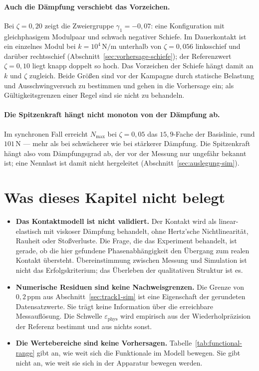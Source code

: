 \documentclass[12pt,a4paper]{report}
\begin{document}
\paragraph{Auch die Dämpfung verschiebt das Vorzeichen.} Bei
$\zeta = 0{,}20$ zeigt die Zweiergruppe $\gamma_1 = -0{,}07$: eine
Konfiguration mit gleichphasigem Modulpaar und schwach negativer
Schiefe. Im Dauerkontakt ist ein einzelnes Modul bei
$k = 10^{4}\,\mathrm{N/m}$ unterhalb von $\zeta = 0{,}056$ linksschief und
darüber rechtsschief (Abschnitt~\ref{sec:vorhersage-schiefe}); der
Referenzwert $\zeta = 0{,}10$ liegt knapp doppelt so hoch. Das
Vorzeichen der Schiefe hängt damit an $k$ und $\zeta$ zugleich. Beide
Größen sind vor der Kampagne durch statische Belastung und
Ausschwingversuch zu bestimmen und gehen in die Vorhersage ein; als
Gültigkeitsgrenzen einer Regel sind sie nicht zu behandeln.

\paragraph{Die Spitzenkraft hängt nicht monoton von der Dämpfung ab.}
Im synchronen Fall erreicht $N_{\max}$ bei $\zeta = 0{,}05$ das
$15{,}9$-Fache der Basislinie, rund $101\,\mathrm{N}$ --- mehr als bei
schwächerer wie bei stärkerer Dämpfung. Die Spitzenkraft hängt also
vom Dämpfungsgrad ab, der vor der Messung nur ungefähr bekannt ist; eine
Nennlast ist damit nicht hergeleitet
(Abschnitt~\ref{sec:auslegung-sim}).

\section{Was dieses Kapitel nicht belegt}

\begin{itemize}
  \item \textbf{Das Kontaktmodell ist nicht validiert.} Der Kontakt wird
        als linear-elastisch mit viskoser Dämpfung behandelt, ohne
        Hertz'sche Nichtlinearität, Rauheit oder Stoßverluste. Die Frage,
        die das Experiment behandelt, ist gerade, ob die hier gefundene
        Phasenabhängigkeit den Übergang zum realen Kontakt übersteht.
        Übereinstimmung zwischen Messung und Simulation ist nicht das
        Erfolgskriterium; das Überleben der qualitativen Struktur ist es.
  \item \textbf{Numerische Residuen sind keine Nachweisgrenzen.} Die
        Grenze von $0{,}2\,\mathrm{ppm}$ aus
        Abschnitt~\ref{sec:track1-sim} ist eine Eigenschaft der gerundeten
        Datensatzwerte. Sie trägt keine Information über die erreichbare
        Messauflösung. Die Schwelle $\varepsilon_{\mathrm{phys}}$ wird
        empirisch aus der Wiederholpräzision der Referenz bestimmt und
        aus nichts sonst.
  \item \textbf{Die Wertebereiche sind keine Vorhersagen.}
        Tabelle~\ref{tab:functional-range} gibt an, wie weit sich die
        Funktionale im Modell bewegen. Sie gibt nicht an, wie weit sie
        sich in der Apparatur bewegen werden.
\end{itemize}
\end{document}
